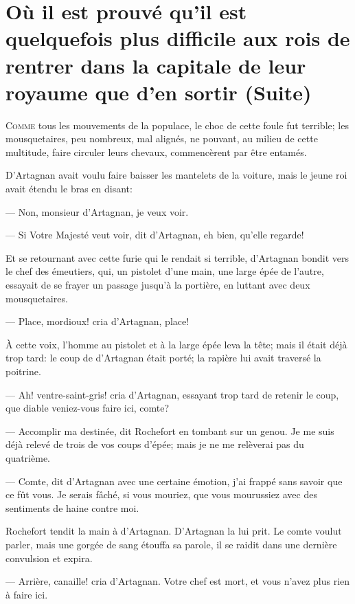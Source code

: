 \chapter[Il est plus difficile aux rois de rentrer dans leur capitale que d'en sortir (Suite)]{Où il est prouvé qu'il est quelquefois plus difficile aux rois de rentrer dans la capitale de leur royaume que d'en sortir (Suite)}

\lettrine{C}{omme} tous les mouvements de la populace, le choc de cette foule fut terrible; les mousquetaires, peu nombreux, mal alignés, ne pouvant, au milieu de cette multitude, faire circuler leurs chevaux, commencèrent par être entamés.

\zz
D'Artagnan avait voulu faire baisser les mantelets de la voiture, mais le jeune roi avait étendu le bras en disant:

— Non, monsieur d'Artagnan, je veux voir.

— Si Votre Majesté veut voir, dit d'Artagnan, eh bien, qu'elle regarde!

Et se retournant avec cette furie qui le rendait si terrible, d'Artagnan bondit vers le chef des émeutiers, qui, un pistolet d'une main, une large épée de l'autre, essayait de se frayer un passage jusqu'à la portière, en luttant avec deux mousquetaires.

— Place, mordioux! cria d'Artagnan, place!

À cette voix, l'homme au pistolet et à la large épée leva la tête; mais il était déjà trop tard: le coup de d'Artagnan était porté; la rapière lui avait traversé la poitrine.

— Ah! ventre-saint-gris! cria d'Artagnan, essayant trop tard de retenir le coup, que diable veniez-vous faire ici, comte?

— Accomplir ma destinée, dit Rochefort en tombant sur un genou. Je me suis déjà relevé de trois de vos coups d'épée; mais je ne me relèverai pas du quatrième.

— Comte, dit d'Artagnan avec une certaine émotion, j'ai frappé sans savoir que ce fût vous. Je serais fâché, si vous mouriez, que vous mourussiez avec des sentiments de haine contre moi.

Rochefort tendit la main à d'Artagnan. D'Artagnan la lui prit. Le comte voulut parler, mais une gorgée de sang étouffa sa parole, il se raidit dans une dernière convulsion et expira.

— Arrière, canaille! cria d'Artagnan. Votre chef est mort, et vous n'avez plus rien à faire ici.

